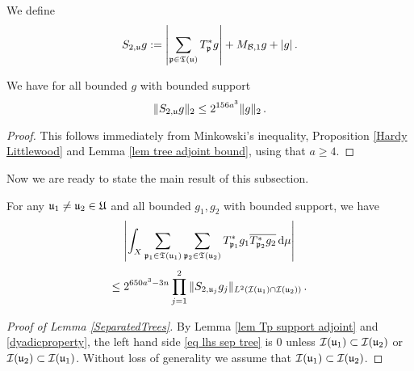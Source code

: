 {We define
$$
    S_{2,\mathfrak u}g := \left|\sum_{\mathfrak p \in \mathfrak T(\mathfrak u)} T_{\mathfrak p}^*g \right| + M_{\mathcal{B},1}g + |g|\,.
$$
\begin{lemma}
    \label{lem L2 Sg estimate}
    We have for all bounded $g$ with bounded support
    $$
        \|S_{2, \mathfrak u} g\|_2 \le 2^{156a^3} \|g\|_2\,.
    $$
\end{lemma}

\begin{proof}
    This follows immediately from Minkowski's inequality, Proposition \ref{Hardy Littlewood} and Lemma \ref{lem tree adjoint bound}, using that $a \ge 4$.
\end{proof}


Now we are ready to state the main result of this subsection.

\begin{lemma}
    \label{SeparatedTrees}
    For any $\mathfrak u_1 \ne \mathfrak u_2 \in \mathfrak U$ and all bounded $g_1, g_2$ with bounded support, we have
    \begin{equation}
        \label{eq lhs sep tree}
        \left| \int_X \sum_{\mathfrak p_1 \in \mathfrak T(\mathfrak u_1)} \sum_{\mathfrak p_2 \in \mathfrak T(\mathfrak u_2)} T^*_{\mathfrak p_1}g_1 \overline{T^*_{\mathfrak p_2}g_2 }\,\mathrm{d}\mu \right|
    \end{equation}
    \begin{equation}
        \label{eq rhs sep tree}
        \le 2^{650a^3-3n} \prod_{j =1}^2 \| S_{2, \mathfrak u_j} g_j\|_{L^2(\mathcal{I}(\mathfrak u_1) \cap \mathcal{I}(\mathfrak u_2))}\,.
    \end{equation}
\end{lemma}

\begin{proof}[Proof of Lemma \ref{SeparatedTrees}]
    By Lemma \ref{lem Tp support adjoint} and \eqref{dyadicproperty}, the left hand side \eqref{eq lhs sep tree} is $0$ unless $\mathcal{I}(\mathfrak u_1) \subset \mathcal{I}(\mathfrak u_2)$ or $\mathcal{I}(\mathfrak u_2) \subset \mathcal{I}(\mathfrak u_1)$. Without loss of generality we assume that $\mathcal{I}(\mathfrak u_1) \subset \mathcal{I}(\mathfrak u_2)$.


\end{proof}}

